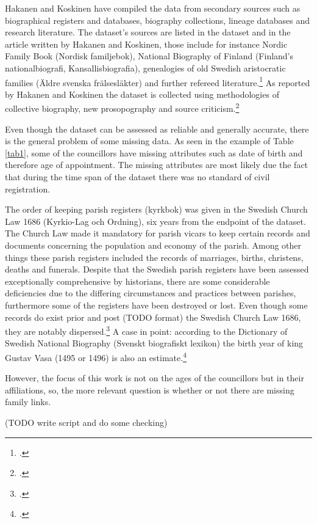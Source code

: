 Hakanen and Koskinen have compiled the data from secondary sources such as biographical registers and databases, biography collections, lineage databases and research literature. The dataset's sources are listed in the dataset and in the article written by Hakanen and Koskinen, those include for instance Nordic Family Book (Nordisk familjebok), National Biography of Finland (Finland's nationalbiografi, Kansallisbiografia), genealogies of old Swedish aristocratic families (Äldre svenska frälsesläkter) and further refereed literature.\footcites[p. 48, 76]{HakanenAKoskinen2017}{councillorsDS} As reported by Hakanen and Koskinen the dataset is collected using methodologies of collective biography, new prosopography and source criticism.\footcite[p. 48.]{HakanenAKoskinen2017}
  
Even though the dataset can be assessed as reliable and generally accurate, there is the general problem of some missing data. As seen in the example of Table \ref{tab1}, some of the councillors have missing attributes such as date of birth and therefore age of appointment. The missing attributes are most likely due the fact that during the time span of the dataset there was no standard of civil registration. 

The order of keeping parish registers (kyrkbok) was given in the Swedish Church Law 1686 (Kyrkio-Lag och Ordning), six years from the endpoint of the dataset. The Church Law made it mandatory for parish vicars to keep certain records and documents concerning the population and economy of the parish. Among other things these parish registers included the records of marriages, births, christens, deaths and funerals. Despite that the Swedish parish registers have been assessed exceptionally comprehensive by historians, there are some considerable deficiencies due to the differing circumstances and practices between parishes, furthermore some of the registers have been destroyed or lost. Even though some records do exist prior and post (TODO format) the Swedish Church Law 1686, they are notably dispersed.\footcite[pp. 169-176.]{viikki94} A case in point: according to the Dictionary of Swedish National Biography (Svenskt biografiskt lexikon) the birth year of king Gustav Vasa (1495 or 1496) is also an estimate.\footcite{sbl_gustav_v} 

However, the focus of this work is not on the ages of the councillors but in their affiliations, so, the more relevant question is whether or not there are missing family links. 

(TODO write script and do some checking)

